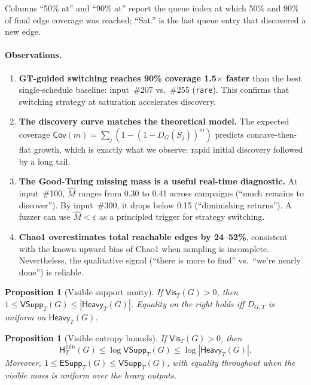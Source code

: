 \documentclass[11pt]{article}
\newtheorem{proposition}[definition]{Proposition}
\theoremstyle{remark}
\theoremstyle{definition}
\begin{document}
Columns ``50\% at'' and ``90\% at'' report the queue index at which 50\%
and 90\% of final edge coverage was reached; ``Sat.'' is the last queue
entry that discovered a new edge.

\paragraph{Observations.}
\begin{enumerate}
  \item \textbf{GT-guided switching reaches 90\% coverage 1.5$\times$
    faster} than the best single-schedule baseline: input~\#207 vs.\
    \#255 (\texttt{rare}).  This confirms that switching strategy at
    saturation accelerates discovery.

  \item \textbf{The discovery curve matches the theoretical model.}
    The expected coverage $\mathsf{Cov}(m) = \sum_j (1-(1-D_G(S_j))^m)$
    predicts concave-then-flat growth, which is exactly what we observe:
    rapid initial discovery followed by a long tail.

  \item \textbf{The Good-Turing missing mass is a useful real-time
    diagnostic.}  At input~\#100, $\widehat{M}$ ranges from 0.30 to 0.41
    across campaigns (``much remains to discover'').  By input~\#300, it
    drops below 0.15 (``diminishing returns'').  A fuzzer can use
    $\widehat{M} < \varepsilon$ as a principled trigger for strategy
    switching.

  \item \textbf{Chao1 overestimates total reachable edges by 24--52\%},
    consistent with the known upward bias of Chao1 when sampling is
    incomplete.  Nevertheless, the qualitative signal (``there is more to
    find'' vs.\ ``we're nearly done'') is reliable.
\end{enumerate}

\begin{proposition}[Visible support sanity]
If $\mathsf{Vis}_T(G) > 0$, then $1 \le \mathsf{VSupp}_T(G) \le |\mathsf{Heavy}_T(G)|$. Equality on the right holds iff $D_{G,T}$ is uniform on $\mathsf{Heavy}_T(G)$.
\end{proposition}

\begin{proposition}[Visible entropy bounds]
If $\mathsf{Vis}_T(G) > 0$, then
\[
\mathsf{H}^{\min}_T(G) \le \log \mathsf{VSupp}_T(G) \le \log |\mathsf{Heavy}_T(G)|.
\]
Moreover, $1 \le \mathsf{ESupp}_T(G) \le \mathsf{VSupp}_T(G)$, with equality throughout when the visible mass is uniform over the heavy outputs.
\end{proposition}
\end{document}
